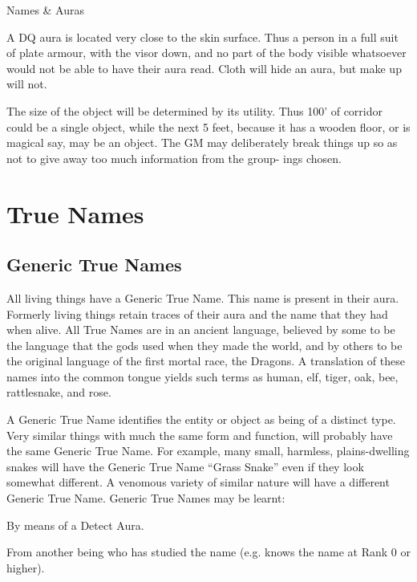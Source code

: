 \begin{Chapter}{Names \& Auras}
\begin{Enumerate}
\item A DQ aura is located very close to the skin surface.  Thus a
  person in a full suit of plate armour, with the visor down, and no
  part of the body visible whatsoever would not be able to have their
  aura read. Cloth will hide an aura, but make up will not.

\item The size of the object will be determined by its utility.  Thus
  100’ of corridor could be a single object, while the next 5 feet,
  because it has a wooden floor, or is magical say, may be an object.
  The GM may deliberately break things up so as not to give away too
  much information from the group- ings chosen.

\end{Enumerate}


\section{True Names}

\subsection{Generic True Names}

All living things have a Generic True Name.  This name is present in
their aura.  Formerly living things retain traces of their aura and
the name that they had when alive.  All True Names are in an ancient
language, believed by some to be the language that the gods used when
they made the world, and by others to be the original language of the
first mortal race, the Dragons. A translation of these names into the
common tongue yields such terms as human, elf, tiger, oak, bee,
rattlesnake, and rose.

A Generic True Name identifies the entity or object as being of a
distinct type. Very similar things with much the same form and
function, will probably have the same Generic True Name.  For example,
many small, harmless, plains-dwelling snakes will have the Generic
True Name “Grass Snake” even if they look somewhat different. A
venomous variety of similar nature will have a different Generic True
Name. Generic True Names may be learnt:

\begin{Itemize}

\item By means of a Detect Aura.  

\item From another being who has studied the name (e.g. knows the name
  at Rank 0 or higher).


\end{Itemize}
\end{Chapter}
